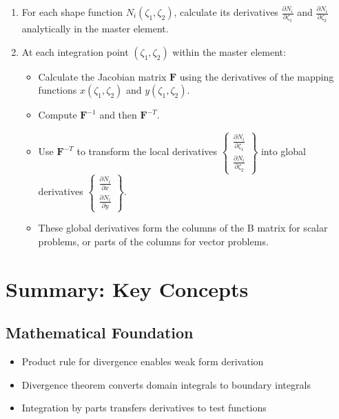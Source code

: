 \documentclass[
  11pt,
  a4paper,
]{scrbook}
\providecommand{\tightlist}{%
  \setlength{\itemsep}{0pt}\setlength{\parskip}{0pt}}\usepackage{longtable,booktabs,array}
\begin{document}
\begin{enumerate}
\def\labelenumi{\arabic{enumi}.}
\item
  For each shape function \(N_i(\zeta_1, \zeta_2)\), calculate its
  derivatives \(\frac{\partial N_i}{\partial \zeta_1}\) and
  \(\frac{\partial N_i}{\partial \zeta_2}\) analytically in the master
  element.
\item
  At each integration point \((\zeta_1, \zeta_2)\) within the master
  element:

  \begin{itemize}
  \tightlist
  \item
    Calculate the Jacobian matrix \(\mathbf{F}\) using the derivatives
    of the mapping functions \(x(\zeta_1, \zeta_2)\) and
    \(y(\zeta_1, \zeta_2)\).
  \item
    Compute \(\mathbf{F}^{-1}\) and then \(\mathbf{F}^{-T}\).
  \item
    Use \(\mathbf{F}^{-T}\) to transform the local derivatives
    \(\begin{Bmatrix} \frac{\partial N_i}{\partial \zeta_1} \\ \frac{\partial N_i}{\partial \zeta_2} \end{Bmatrix}\)
    into global derivatives
    \(\begin{Bmatrix} \frac{\partial N_i}{\partial x} \\ \frac{\partial N_i}{\partial y} \end{Bmatrix}\).
  \item
    These global derivatives form the columns of the B matrix for scalar
    problems, or parts of the columns for vector problems.
  \end{itemize}
\end{enumerate}

\section{Summary: Key Concepts}\label{summary-key-concepts}

\subsection{Mathematical Foundation}\label{mathematical-foundation}

\begin{itemize}
\tightlist
\item
  Product rule for divergence enables weak form derivation
\item
  Divergence theorem converts domain integrals to boundary integrals
\item
  Integration by parts transfers derivatives to test functions
\end{itemize}
\end{document}
